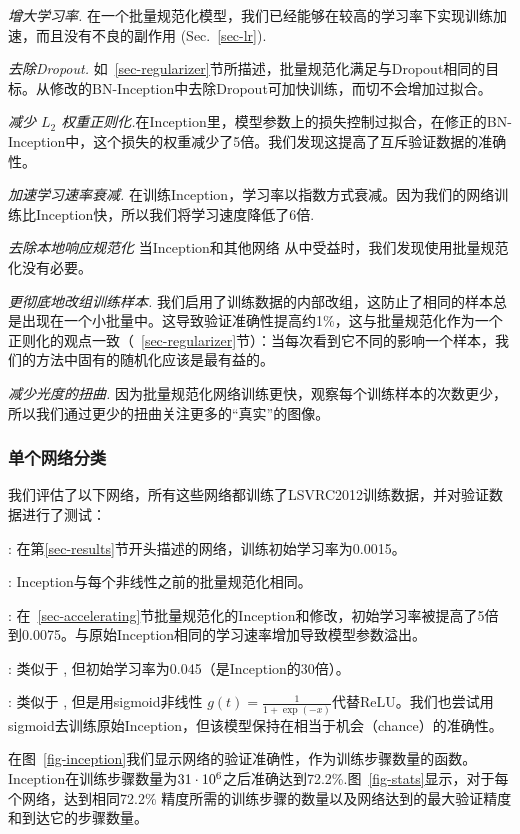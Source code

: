 \documentclass[twocolumn]{article}
\begin{document}
{\em 增大学习率.} 在一个批量规范化模型，我们已经能够在较高的学习率下实现训练加速，而且没有不良的副作用 (Sec.~\ref{sec-lr}).

 {\em 去除Dropout.} 如~\ref{sec-regularizer}节所描述，批量规范化满足与Dropout相同的目标。从修改的BN-Inception中去除Dropout可加快训练，而切不会增加过拟合。
 
{\em 减少 $L_2$ 权重正则化.}在Inception里，模型参数上的损失控制过拟合，在修正的BN-Inception中，这个损失的权重减少了5倍。我们发现这提高了互斥验证数据的准确性。

{\em 加速学习速率衰减.} 
在训练Inception，学习率以指数方式衰减。因为我们的网络训练比Inception快，所以我们将学习速度降低了6倍.

{\em 去除本地响应规范化}   当Inception和其他网络 \cite{dropout} 从中受益时，我们发现使用批量规范化没有必要。

{\em 更彻底地改组训练样本.} 
我们启用了训练数据的内部改组，这防止了相同的样本总是出现在一个小批量中。这导致验证准确性提高约1\%，这与批量规范化作为一个正则化的观点一致（~\ref{sec-regularizer}节）：当每次看到它不同的影响一个样本，我们的方法中固有的随机化应该是最有益的。

{\em 减少光度的扭曲.}
因为批量规范化网络训练更快，观察每个训练样本的次数更少，所以我们通过更少的扭曲关注更多的“真实”的图像。

\subsubsection{单个网络分类}
我们评估了以下网络，所有这些网络都训练了LSVRC2012训练数据，并对验证数据进行了测试：

: 在第\ref{sec-results}节开头描述的网络，训练初始学习率为0.0015。

: Inception与每个非线性之前的批量规范化相同。

: 在~\ref{sec-accelerating}节批量规范化的Inception和修改，初始学习率被提高了5倍到0.0075。与原始Inception相同的学习速率增加导致模型参数溢出。

: 类似于 , 但初始学习率为0.045（是Inception的30倍）。

: 类似于 , 但是用sigmoid非线性 $g(t)=\frac{1}{1+\exp(-x)}$代替ReLU。我们也尝试用sigmoid去训练原始Inception，但该模型保持在相当于机会（chance）的准确性。

在图~\ref{fig-inception}我们显示网络的验证准确性，作为训练步骤数量的函数。Inception在训练步骤数量为$31\cdot 10^6$之后准确达到72.2\%.图~\ref{fig-stats}显示，对于每个网络，达到相同72.2\% 精度所需的训练步骤的数量以及网络达到的最大验证精度和到达它的步骤数量。
\end{document}
